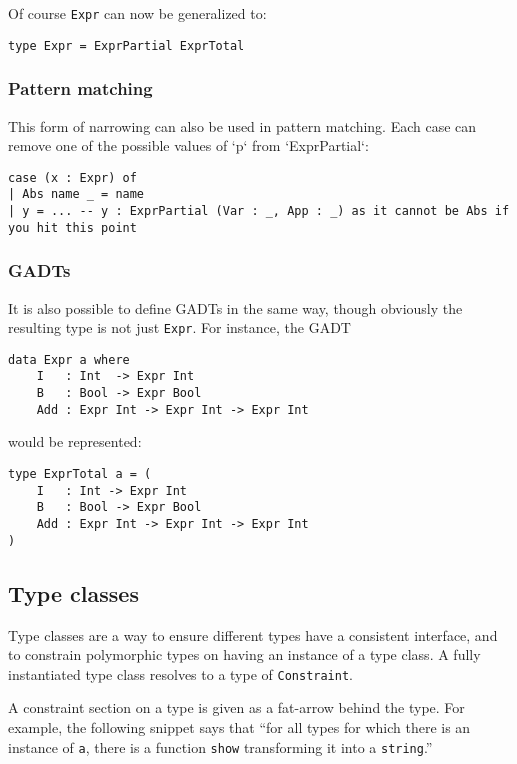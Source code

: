 Of course \texttt{Expr} can now be generalized to:

\begin{verbatim}
type Expr = ExprPartial ExprTotal
\end{verbatim}

\subsubsection{Pattern matching}
This form of narrowing can also be used in pattern matching. Each case can remove one of the possible values of `p` from `ExprPartial`:

\begin{verbatim}
case (x : Expr) of
| Abs name _ = name
| y = ... -- y : ExprPartial (Var : _, App : _) as it cannot be Abs if you hit this point
\end{verbatim}

\subsubsection{GADTs}
It is also possible to define GADTs in the same way, though obviously the resulting type is not just \texttt{Expr}. For instance, the GADT

\begin{verbatim}
data Expr a where
    I   : Int  -> Expr Int
    B   : Bool -> Expr Bool
    Add : Expr Int -> Expr Int -> Expr Int
\end{verbatim}

would be represented:

\begin{verbatim}
type ExprTotal a = (
    I   : Int -> Expr Int
    B   : Bool -> Expr Bool
    Add : Expr Int -> Expr Int -> Expr Int
)
\end{verbatim}

\subsection{Type classes}
Type classes are a way to ensure different types have a consistent interface, and to constrain polymorphic types on having an instance of a type class. A fully instantiated type class resolves to a type of \texttt{Constraint}.

A constraint section on a type is given as a fat-arrow behind the type. For example, the following snippet says that ``for all types for which there is an instance of \texttt{a}, there is a function \texttt{show} transforming it into a \texttt{string}.''

